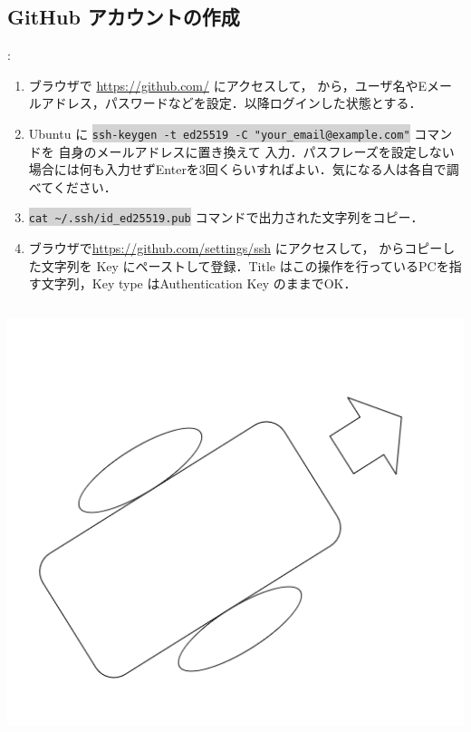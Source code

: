 \documentclass[aspectratio=169,dvipdfmx,cjk]{beamer}
\newcommand{\cmdline}[1]{
    \colorbox{lightgray}{\lstinline[style=command]{#1}}
}
\newcommand{\blue}[1]{ {\color{blue} #1} }
\begin{document}
\subsection{GitHub アカウントの作成}
\begin{frame}{\insertsection \thesubsection: \insertsubsection}
  \begin{enumerate}
    \item ブラウザで \href{https://github.com/}{https://github.com/} にアクセスして， から，ユーザ名やEメールアドレス，パスワードなどを設定\cite{GitHubAccount}．以降ログインした状態とする．
    \item Ubuntu に\cmdline{ssh-keygen -t ed25519 -C "your_email@example.com"} コマンドを\blue{自身のメールアドレスに置き換えて}入力．パスフレーズを設定しない場合には何も入力せずEnterを3回くらいすればよい．気になる人は各自で調べてください\cite{GitHubSSH}．
    \item \cmdline{cat ~/.ssh/id_ed25519.pub} コマンドで出力された文字列をコピー\cite{GitHubAccount}．
    \item ブラウザで\href{https://github.com/settings/ssh}{https://github.com/settings/ssh} にアクセスして， からコピーした文字列を Key にペーストして登録\cite{GitHubAccount}．Title はこの操作を行っているPCを指す文字列，Key type はAuthentication Key のままでOK．
  \end{enumerate}
  \begin{columns}
    \begin{column}{0.33\textwidth}
        \includegraphics[width=1.0\linewidth]{fig/robot.png}

\end{column}
\end{columns}
\end{frame}
\end{document}
